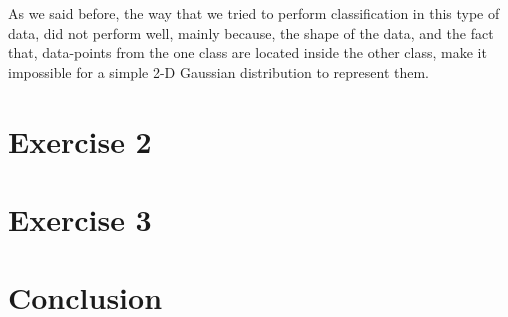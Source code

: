 \documentclass[a4paper,11pt]{article}
\begin{document}
As we said before, the way that we tried to perform classification in this type of data, did not perform well, mainly because, the shape of the data, and the fact that, data-points from the one class are located inside the other class, make it impossible for a simple 2-D Gaussian distribution to represent them.



\newpage

\section*{Exercise 2}

\newpage
\section*{Exercise 3}


\newpage
\section*{Conclusion}
\newpage
\end{document}
